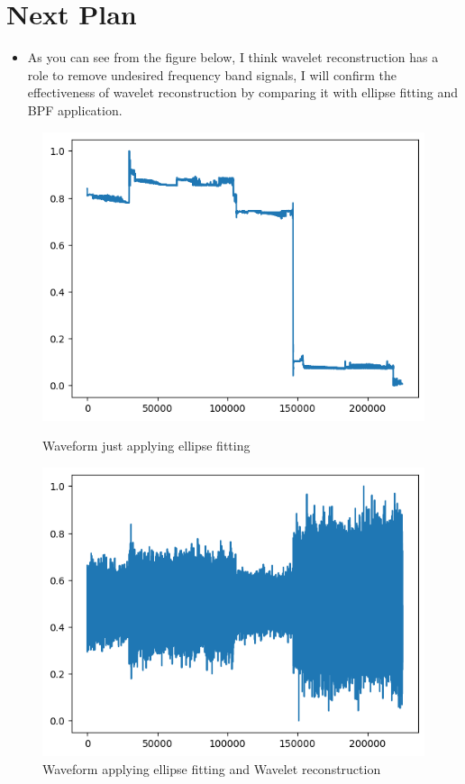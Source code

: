 \documentclass[dvipdfmx]{article}
\begin{document}
\section{Next Plan}
\begin{itemize}
    \item As you can see from the figure below, I think wavelet reconstruction has a role to remove undesired frequency band signals, I will confirm the effectiveness of wavelet reconstruction by comparing it with ellipse fitting and BPF application.
\end{itemize}

\begin{figure}[htbp]
    \begin{minipage}[c]{0.5\hsize}
      \centering
      \includegraphics[width=\linewidth]{./img/wave_el.png}
      \caption{Waveform just applying ellipse fitting}
    \end{minipage}
    \begin{minipage}[c]{0.5\hsize}
      \centering
      \includegraphics[width=\linewidth]{./img/wave_elwav.png}
      \caption{Waveform applying ellipse fitting and Wavelet reconstruction}
    \end{minipage}
  \end{figure}
\end{document}
